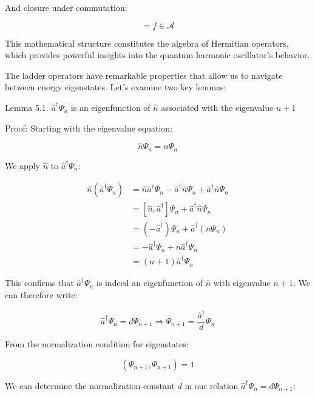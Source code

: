 \documentclass[10pt]{article}
\begin{document}
And closure under commutation:

\begin{equation*}
[b,c] = f \in \mathcal{A} \tag{5.21}
\end{equation*}

This mathematical structure constitutes the algebra of Hermitian operators, which provides powerful insights into the quantum harmonic oscillator's behavior.

The ladder operators have remarkable properties that allow us to navigate between energy eigenstates. Let's examine two key lemmas:

Lemma 5.1. $\hat{a}^\dagger\Psi_n$ is an eigenfunction of $\hat{n}$ associated with the eigenvalue $n+1$

Proof:
Starting with the eigenvalue equation:

\begin{equation*}
\hat{n}\Psi_n = n\Psi_n \tag{5.22}
\end{equation*}

We apply $\hat{n}$ to $\hat{a}^\dagger\Psi_n$:

\begin{align*}
\hat{n}(\hat{a}^\dagger\Psi_n) &= \hat{n}\hat{a}^\dagger\Psi_n - \hat{a}^\dagger\hat{n}\Psi_n + \hat{a}^\dagger\hat{n}\Psi_n \\
&= [\hat{n}, \hat{a}^\dagger]\Psi_n + \hat{a}^\dagger\hat{n}\Psi_n \\
&= (-\hat{a}^\dagger)\Psi_n + \hat{a}^\dagger(n\Psi_n) \tag{5.23} \\
&= -\hat{a}^\dagger\Psi_n + n\hat{a}^\dagger\Psi_n \\
&= (n+1)\hat{a}^\dagger\Psi_n
\end{align*}

This confirms that $\hat{a}^\dagger\Psi_n$ is indeed an eigenfunction of $\hat{n}$ with eigenvalue $n+1$. We can therefore write:

\begin{equation*}
\hat{a}^\dagger\Psi_n = d\Psi_{n+1} \Longrightarrow \Psi_{n+1} = \frac{\hat{a}^\dagger}{d}\Psi_n \tag{5.24}
\end{equation*}


From the normalization condition for eigenstates:

\begin{equation*}
(\Psi_{n+1}, \Psi_{n+1}) = 1 \tag{5.25}
\end{equation*}

We can determine the normalization constant $d$ in our relation $\hat{a}^\dagger\Psi_n = d\Psi_{n+1}$:
\end{document}
